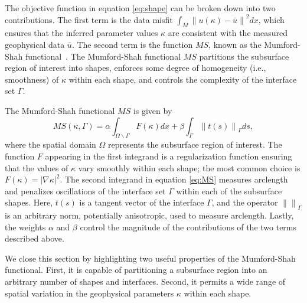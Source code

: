 \documentclass[manuscript,revised]{geophysics}
\newcommand\norm[1]{\left\lVert#1\right\rVert}
\begin{document}
The objective function in equation \ref{eq:shape} can be broken down into two contributions.  The first term is the data misfit  $\int_M \norm{u(\kappa)-\bar{u}}^2  dx$, which ensures that the inferred parameter values $\kappa$ are consistent with the measured geophysical data $\bar{u}$.  The second term is the function $MS$, known as the Mumford-Shah functional~\cite{Mumford_1989}. The Mumford-Shah functional $MS$ partitions the subsurface region of interest into shapes, enforces some degree of homogeneity (i.e., smoothness) of $\kappa$ within each shape, and controls the complexity of the interface set $\Gamma$. 

The Mumford-Shah functional $MS$ is given by
\begin{equation} \label{eq:MS}
MS(\kappa,\Gamma)=\alpha \int_{\Omega\backslash\Gamma} F(\kappa) dx + \beta\int_\Gamma \norm{t(s)}_\Gamma  ds ,
\end{equation}
where the spatial domain $\Omega$ represents the subsurface region of interest.  The function $F$ appearing in the first integrand is a regularization function ensuring that the values of $\kappa$ vary smoothly within each shape; the most common choice is $F(\kappa)=\left\vert \nabla \kappa \right\vert^2$.   The second integrand in equation \ref{eq:MS} measures arclength and penalizes oscillations of the interface set $\Gamma$ within each of the subsurface shapes.  Here, $t(s)$ is a tangent vector of the interface $\Gamma$, and the operator $\norm{}_\Gamma$ is an arbitrary norm, potentially anisotropic, used to measure arclength.  Lastly, the weights $\alpha$ and $\beta$ control the magnitude of the contributions of the two terms described above.  


We close this section by highlighting two useful properties of the Mumford-Shah functional.  First, it is capable of partitioning a subsurface region into an arbitrary number of shapes and interfaces. Second, it permits a wide range of spatial variation in the geophysical parameters $\kappa$ within each shape.
\end{document}
